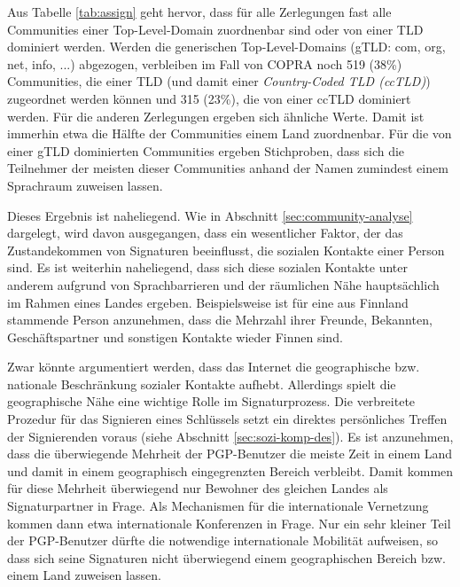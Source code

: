 Aus Tabelle \ref{tab:assign} geht hervor, dass f\"ur alle Zerlegungen
fast alle Communities einer Top-Level-Domain zuordnenbar sind oder von
einer TLD dominiert werden. Werden die generischen Top-Level-Domains
(gTLD: com, org, net, info, ...) abgezogen, verbleiben im Fall von COPRA
noch 519 (38\%) Communities, die einer TLD (und damit einer
\emph{Country-Coded TLD (ccTLD)}) zugeordnet werden k\"onnen und 315
(23\%), die von einer ccTLD dominiert werden. F\"ur die anderen
Zerlegungen ergeben sich \"ahnliche Werte. Damit ist immerhin etwa die
H\"alfte der Communities einem Land zuordnenbar. F\"ur die von einer
gTLD dominierten Communities ergeben Stichproben, dass sich die
Teilnehmer der meisten dieser Communities anhand der Namen zumindest
einem Sprachraum zuweisen lassen.

Dieses Ergebnis ist naheliegend. Wie in Abschnitt
\ref{sec:community-analyse} dargelegt, wird davon ausgegangen, dass
ein wesentlicher Faktor, der das Zustandekommen von Signaturen
beeinflusst, die sozialen Kontakte einer Person sind. Es ist weiterhin
naheliegend, dass sich diese sozialen Kontakte unter anderem aufgrund
von Sprachbarrieren und der r\"aumlichen N\"ahe haupts\"achlich im
Rahmen eines Landes ergeben. Beispielsweise ist f\"ur eine aus
Finnland stammende Person anzunehmen, dass die Mehrzahl ihrer Freunde,
Bekannten, Gesch\"aftspartner und sonstigen Kontakte wieder Finnen
sind.

Zwar k\"onnte argumentiert werden, dass das Internet die geographische
bzw. nationale Beschr\"ankung sozialer Kontakte aufhebt. Allerdings
spielt die geographische N\"ahe eine wichtige Rolle im
Signaturprozess. Die verbreitete Prozedur f\"ur das Signieren eines
Schl\"ussels setzt ein direktes pers\"onliches Treffen der
Signierenden voraus (siehe Abschnitt \ref{sec:sozi-komp-des}). Es ist
anzunehmen, dass die \"uberwiegende Mehrheit der PGP-Benutzer die
meiste Zeit in einem Land und damit in einem geographisch
eingegrenzten Bereich verbleibt. Damit kommen f\"ur diese Mehrheit
\"uberwiegend nur Bewohner des gleichen Landes als Signaturpartner in
Frage. Als Mechanismen f\"ur die internationale Vernetzung kommen dann
etwa internationale Konferenzen in Frage. Nur ein sehr kleiner Teil
der PGP-Benutzer d\"urfte die notwendige internationale Mobilit\"at
aufweisen, so dass sich seine Signaturen nicht \"uberwiegend einem
geographischen Bereich bzw. einem Land zuweisen lassen.


